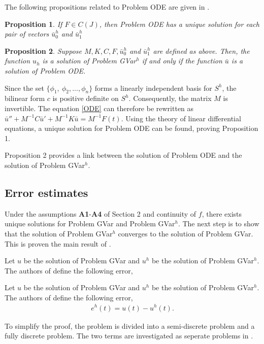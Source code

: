 \documentclass[../../main.tex]{subfiles}
\begin{document}
The following propositions related to Problem ODE are given in \cite{BV13}.

\newtheorem{DC_Prop2}{Proposition}
\begin{DC_Prop2}
	If $F\in C(J)$, then Problem ODE has a unique solution for each pair of vectors $\bar{u}^h_0$ and $\bar{u}^h_1$
\end{DC_Prop2}

\newtheorem{DC_Prop3}[DC_Prop2]{Proposition}
\begin{DC_Prop3}
	Suppose $M, K, C, F,\bar{u}^h_0$ and $\bar{u}^h_1$ are defined as above. Then, the function $u_{h}$ is a solution of Problem GVar$^{h}$ if and only if the function $\bar{u}$ is a solution of Problem ODE.
\end{DC_Prop3}

Since the set $\{\phi_1, \ \phi_2,...,\phi_n\}$ forms a linearly independent
basis for $S^h$, the bilinear form $c$ is positive definite on $S^h$.
Consequently, the matrix $M$ is invertible. The equation \eqref{ODE} can
therefore be rewritten as $\bar{u}'' + M^{-1}C\bar{u}' + M^{-1}K \bar{u} =
	M^{-1}F(t)$. Using the theory of linear differential equations, a unique
solution for Problem ODE can be found, proving Proposition 1.

Proposition 2 provides a link between the solution of Problem ODE and the
solution of Problem GVar$^h$.

\subsection{Error estimates}\label{e_est}
Under the assumptions \textbf{A1}-\textbf{A4} of Section 2 and continuity of $f$, there exists unique solutions for Problem GVar and Problem GVar$^h$. The next step is to show that the solution of Problem GVar$^h$ converges to the solution of Problem GVar. This is proven the main result of \cite{BV13}.

Let $u$ be the solution of Problem GVar and $u^h$ be the solution of Problem
GVar$^h$. The authors of \cite{BV13} define the following error,

Let $u$ be the solution of Problem GVar and $u^h$ be the solution of Problem GVar$^h$.
 The authors of \cite{BV13} define the following error,
\begin{eqnarray}
	e^h(t) = u(t) - u^h(t). \label{Error}
\end{eqnarray}

To simplify the proof, the problem is divided into a semi-discrete problem and a fully discrete problem. The two terms are investigated as seperate problems
in \cite{BV13}.
\end{document}
